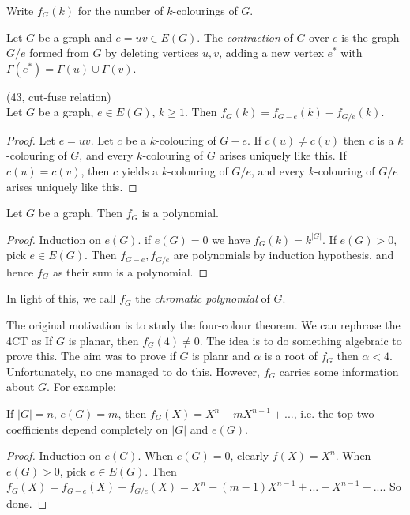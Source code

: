 \documentclass[a4paper]{article}
\begin{document}
Write $f_G(k)$ for the number of $k$-colourings of $G$.

\begin{defi}
Let $G$ be a graph and $e=uv \in E(G)$. The \emph{contraction} of $G$ over $e$ is the graph $G/e$ formed from $G$ by deleting vertices $u,v$, adding a new vertex $e^*$ with $\Gamma(e^*) = \Gamma(u)  \cup \Gamma(v)$.
\end{defi}

\begin{thm} (43, cut-fuse relation)\\
Let $G$ be a graph, $e \in E(G)$, $k \geq 1$. Then $f_G(k) = f_{G-e}(k) - f_{G/e}(k)$.
\begin{proof}
Let $e=uv$. Let $c$ be a $k$-colouring of $G-e$. If $c(u) \neq c(v)$ then $c$ is a $k$-colouring of $G$, and every $k$-colouring of $G$ arises uniquely like this. If $c(u) = c(v)$, then $c$ yields a $k$-colouring of $G/e$, and every $k$-colouring of $G/e$ arises uniquely like this.
\end{proof}
\end{thm}

\begin{coro}
Let $G$ be a graph. Then $f_G$ is a polynomial.
\begin{proof}
Induction on $e(G)$. if $e(G) = 0$ we have $f_G(k) = k^{|G|}$. If $e(G) > 0$, pick $e \in E(G)$. Then $f_{G-e},f_{G/e}$ are polynomials by induction hypothesis, and hence $f_G$ as their sum is a polynomial.
\end{proof}
\end{coro}

In light of this, we call $f_G$ the \emph{chromatic polynomial} of $G$.

The original motivation is to study the four-colour theorem. We can rephrase the 4CT as If $G$ is planar, then $f_G(4) \neq 0$. The idea is to do something algebraic to prove this. The aim was to prove if $G$ is planr and $\alpha$ is a root of $f_G$ then $\alpha<4$. Unfortunately, no one managed to do this. However, $f_G$ carries some information about $G$. For example:

\begin{coro}
If $|G| = n$, $e(G) = m$, then $f_G(X) = X^n-mX^{n-1}+...$, i.e. the top two coefficients depend completely on $|G|$ and $e(G)$.
\begin{proof}
Induction on $e(G)$. When $e(G) = 0$, clearly $f(X) = X^n$. When $e(G) > 0$, pick $e \in E(G)$. Then $f_G(X) = f_{G-e}(X) - f_{G/e}(X) = X^n - (m-1)X^{n-1}+... - X^{n-1}-...$. So done.
\end{proof}
\end{coro}
\end{document}
